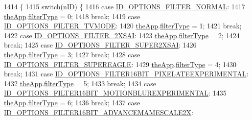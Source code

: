 \begin{DoxyCode}
1414 \{
1415   \textcolor{keywordflow}{switch}(nID) \{
1416   \textcolor{keywordflow}{case} \mbox{\hyperlink{resource_8h_a25dffe1863840876df4f1a6115356a9a}{ID\_OPTIONS\_FILTER\_NORMAL}}:
1417     \mbox{\hyperlink{_v_b_a_8cpp_a8095a9d06b37a7efe3723f3218ad8fb3}{theApp}}.\mbox{\hyperlink{class_v_b_a_a835f54f74420b21459e0f3ce0eacc20d}{filterType}} = 0;
1418     \textcolor{keywordflow}{break};
1419   \textcolor{keywordflow}{case} \mbox{\hyperlink{resource_8h_a16010f346f94112a47abf20452339c56}{ID\_OPTIONS\_FILTER\_TVMODE}}:
1420     \mbox{\hyperlink{_v_b_a_8cpp_a8095a9d06b37a7efe3723f3218ad8fb3}{theApp}}.\mbox{\hyperlink{class_v_b_a_a835f54f74420b21459e0f3ce0eacc20d}{filterType}} = 1;
1421     \textcolor{keywordflow}{break};
1422   \textcolor{keywordflow}{case} \mbox{\hyperlink{resource_8h_a071863ea5c811c0e06f114a82a0dadab}{ID\_OPTIONS\_FILTER\_2XSAI}}:
1423     \mbox{\hyperlink{_v_b_a_8cpp_a8095a9d06b37a7efe3723f3218ad8fb3}{theApp}}.\mbox{\hyperlink{class_v_b_a_a835f54f74420b21459e0f3ce0eacc20d}{filterType}} = 2;
1424     \textcolor{keywordflow}{break};
1425   \textcolor{keywordflow}{case} \mbox{\hyperlink{resource_8h_a86cc1c19f8454ac2cf99950637d3591f}{ID\_OPTIONS\_FILTER\_SUPER2XSAI}}:
1426     \mbox{\hyperlink{_v_b_a_8cpp_a8095a9d06b37a7efe3723f3218ad8fb3}{theApp}}.\mbox{\hyperlink{class_v_b_a_a835f54f74420b21459e0f3ce0eacc20d}{filterType}} = 3;
1427     \textcolor{keywordflow}{break};
1428   \textcolor{keywordflow}{case} \mbox{\hyperlink{resource_8h_ad67d0cc174b31d83f60c7015545b3d52}{ID\_OPTIONS\_FILTER\_SUPEREAGLE}}:
1429     \mbox{\hyperlink{_v_b_a_8cpp_a8095a9d06b37a7efe3723f3218ad8fb3}{theApp}}.\mbox{\hyperlink{class_v_b_a_a835f54f74420b21459e0f3ce0eacc20d}{filterType}} = 4;
1430     \textcolor{keywordflow}{break};
1431   \textcolor{keywordflow}{case} \mbox{\hyperlink{resource_8h_a5ba4548fe715791a996120215dcbffa8}{ID\_OPTIONS\_FILTER16BIT\_PIXELATEEXPERIMENTAL}}:
1432     \mbox{\hyperlink{_v_b_a_8cpp_a8095a9d06b37a7efe3723f3218ad8fb3}{theApp}}.\mbox{\hyperlink{class_v_b_a_a835f54f74420b21459e0f3ce0eacc20d}{filterType}} = 5;
1433     \textcolor{keywordflow}{break};
1434   \textcolor{keywordflow}{case} \mbox{\hyperlink{resource_8h_a5d839edecfebb856488f6eebca043bc9}{ID\_OPTIONS\_FILTER16BIT\_MOTIONBLUREXPERIMENTAL}}:
1435     \mbox{\hyperlink{_v_b_a_8cpp_a8095a9d06b37a7efe3723f3218ad8fb3}{theApp}}.\mbox{\hyperlink{class_v_b_a_a835f54f74420b21459e0f3ce0eacc20d}{filterType}} = 6;
1436     \textcolor{keywordflow}{break};
1437   \textcolor{keywordflow}{case} \mbox{\hyperlink{resource_8h_aa3b4f57a41ac2953adf77f949cf57f65}{ID\_OPTIONS\_FILTER16BIT\_ADVANCEMAMESCALE2X}}:

\end{DoxyCode}
